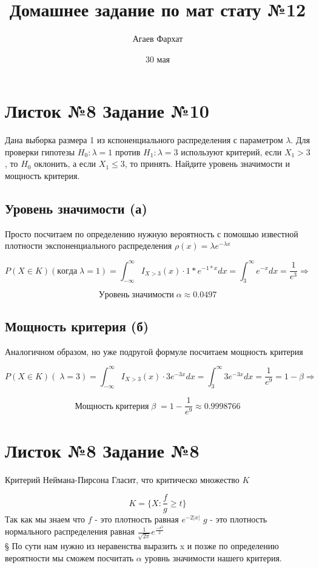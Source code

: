 \documentclass[a4paper, 12pt]{article} %
\author{Агаев Фархат}
\title{Домашнее задание по мат стату №12}
\begin{document}
\date{30 мая}
\maketitle

\section*{Листок №8 Задание №10}
Дана выборка размера 1 из кспоненциального распределения с параметром 
$\lambda$. Для проверки гипотезы $H_0 : \lambda = 1$ против $H_1 : \lambda =3$
используют критерий, если $X_1 > 3$, то $H_0$ оклонить, а если $X_1 \leq 3$, то принять. 
Найдите уровень значимости и мощность критерия.
\subsection*{Уровень значимости (а)}

Просто посчитаем по определению нужную вероятность 
с помошью известной плотности экспоненциального распределения
$\rho(x) = \lambda e^{-\lambda x}$

\[
P(X \in K) (когда \; \lambda = 1) = \int_{-\infty}^{\infty} 
I_{X > 3}(x) \cdot 1 * e^{-1 * x} dx = \int_{3}^{\infty} e^{-x}dx = \frac{1}{e^{3}} \Rightarrow
\]

\[
    Уровень \; значимости \; \alpha \approx 0.0497    
\]

\subsection*{Мощность критерия (б)}
Аналогичном образом, но уже подругой формуле посчитаем мощность критерия

\[
P(X \in K) ( \; \lambda = 3) = \int_{-\infty}^{\infty} 
I_{X > 3}(x) \cdot 3 e^{-3 x} dx = \int_{3}^{\infty} 3e^{-3x}dx = \frac{1}{e^{9}}
= 1 - \beta \Rightarrow 
\]

\[
    Мощность \; критерия \; \beta \; = 1 -  \frac{1}{e^{9}} \approx 0.9998766
\]


\section*{Листок №8 Задание №8}

Критерий Неймана-Пирсона Гласит, что критическо множество $K$ 

\[
    K = \{ X : \frac{f}{g} \geq t\}   
\]
Так как мы знаем что $f$ - это плотность равная $e^{-2|x|}$ 
$g$ - это плотность нормального распределения равная $\frac{1}{\sqrt{2\pi}}e^{\frac{-x^2}{2}}$
\\§
По сути нам нужно из неравенства выразить x и позже по определению вероятности 
мы сможем посчитать $\alpha$ уровнь значимости нашего критерия.
\end{document}
